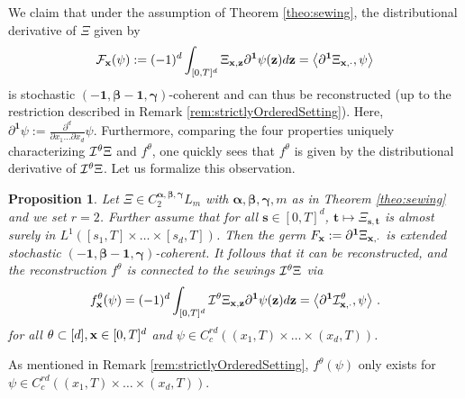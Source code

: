 \documentclass[12pt]{article}
\numberwithin{equation}{section}
\theoremstyle{plain}
\newtheorem{proposition}[theorem]{Proposition}
\theoremstyle{definition}
\newcommand{\scalar}[1]{\left\langle #1 \right\rangle}
\def\fs{\mathbf s}\def\ft{\mathbf t}
\def\falpha{{\boldsymbol\alpha}}
\def\fbeta{{\boldsymbol\beta}}
\def\fgamma{{\boldsymbol\gamma}}
\def\fone{{\boldsymbol 1}}
\begin{document}
\noindent We claim that under the assumption of Theorem \ref{theo:sewing}, the distributional derivative of $\Xi$ given by
\[
    \cF_\fx(\psi) := (-1)^d\int_{[0,T]^d} \Xi_{\fx,\fz}\partial^\fone \psi(\fz)d\fz = \scalar{\partial^\fone\Xi_{\fx,\cdot},\psi}
\]
is stochastic $(-\fone,\fbeta-\fone,\fgamma)$-coherent and can thus be reconstructed (up to the restriction described in Remark \ref{rem:strictlyOrderedSetting}). Here, $\partial^\fone \psi := \frac{\partial^d}{\partial x_1 \dots\partial x_d}\psi$. Furthermore, comparing the four properties uniquely characterizing $\mathcal{I}^\theta\Xi$ and $f^\theta$, one quickly sees that $f^\theta$ is given by the distributional derivative of $\mathcal{I}^\theta\Xi$. Let us formalize this observation.

\begin{proposition}\label{prop:SewingIsReconstruction}
    Let $\Xi\in C_2^{\falpha,\fbeta,\fgamma}L_m$ with $\falpha,\fbeta,\fgamma,m$ as in Theorem \ref{theo:sewing} and we set $r=2$. Further assume that for all $\fs\in[0,T]^d$, $\ft\mapsto \Xi_{\fs,\ft}$ is almost surely in $L^1([s_1,T]\times\dots\times[s_d,T])$. Then the germ $F_\fx := \partial^\fone\Xi_{\fx,\cdot}$ is extended stochastic $(-\fone,\fbeta-\fone,\fgamma)$-coherent. It follows that it can be reconstructed, and the reconstruction $f^\theta$ is connected to the sewings $\mathcal{I}^\theta\Xi$ via
    \begin{equation*}
         f^\theta_\fx(\psi) = (-1)^d \int_{[0,T]^d} \cI^\theta\Xi_{\fx,\fz}\partial^\fone\psi(\fz)d\fz = \scalar{\partial^\fone\cI^\theta_{\fx,\cdot},\psi}\,.
    \end{equation*}
    for all $\theta\subset[d], \mathbf x\in[0,T]^d$ and $\psi\in C^{rd}_c((x_1,T)\times\dots\times(x_d,T))$.
\end{proposition}

\noindent As mentioned in Remark \ref{rem:strictlyOrderedSetting}, $f^\theta(\psi)$ only exists for $\psi\in C^{rd}_c((x_1,T)\times\dots\times(x_d,T))$.
\end{document}
